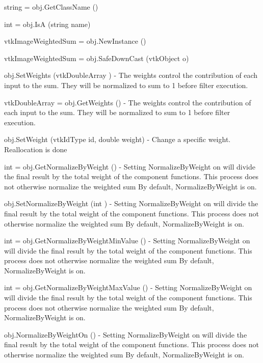 \begin{DoxyItemize}
\item {\ttfamily string = obj.\-Get\-Class\-Name ()}  
\item {\ttfamily int = obj.\-Is\-A (string name)}  
\item {\ttfamily vtk\-Image\-Weighted\-Sum = obj.\-New\-Instance ()}  
\item {\ttfamily vtk\-Image\-Weighted\-Sum = obj.\-Safe\-Down\-Cast (vtk\-Object o)}  
\item {\ttfamily obj.\-Set\-Weights (vtk\-Double\-Array )} -\/ The weights control the contribution of each input to the sum. They will be normalized to sum to 1 before filter execution.  
\item {\ttfamily vtk\-Double\-Array = obj.\-Get\-Weights ()} -\/ The weights control the contribution of each input to the sum. They will be normalized to sum to 1 before filter execution.  
\item {\ttfamily obj.\-Set\-Weight (vtk\-Id\-Type id, double weight)} -\/ Change a specific weight. Reallocation is done  
\item {\ttfamily int = obj.\-Get\-Normalize\-By\-Weight ()} -\/ Setting Normalize\-By\-Weight on will divide the final result by the total weight of the component functions. This process does not otherwise normalize the weighted sum By default, Normalize\-By\-Weight is on.  
\item {\ttfamily obj.\-Set\-Normalize\-By\-Weight (int )} -\/ Setting Normalize\-By\-Weight on will divide the final result by the total weight of the component functions. This process does not otherwise normalize the weighted sum By default, Normalize\-By\-Weight is on.  
\item {\ttfamily int = obj.\-Get\-Normalize\-By\-Weight\-Min\-Value ()} -\/ Setting Normalize\-By\-Weight on will divide the final result by the total weight of the component functions. This process does not otherwise normalize the weighted sum By default, Normalize\-By\-Weight is on.  
\item {\ttfamily int = obj.\-Get\-Normalize\-By\-Weight\-Max\-Value ()} -\/ Setting Normalize\-By\-Weight on will divide the final result by the total weight of the component functions. This process does not otherwise normalize the weighted sum By default, Normalize\-By\-Weight is on.  
\item {\ttfamily obj.\-Normalize\-By\-Weight\-On ()} -\/ Setting Normalize\-By\-Weight on will divide the final result by the total weight of the component functions. This process does not otherwise normalize the weighted sum By default, Normalize\-By\-Weight is on.  

\end{DoxyItemize}
